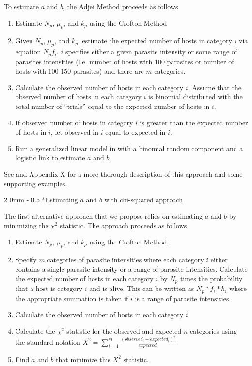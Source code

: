 \documentclass[12pt, a4paper]{article}
\makeatletter
\renewcommand{\subsection}{\@startsection
{subsection}%
{2}%
{0mm}%
{-\baselineskip}%
{0.5\baselineskip}%
{\normalfont\bf}} %
\makeatother
\begin{document}
To estimate $a$ and $b$, the Adjei Method proceeds as follows \citep{Adjei1986}

\singlespacing
\begin{enumerate}
    \item Estimate $N_p$, $\mu_p$, and $k_p$ using the Crofton Method
    \item Given $N_p$, $\mu_p$, and $k_p$, estimate the expected number of hosts in category $i$ via equation $N_p f_i$.  $i$ specifies either a given parasite intensity or some range of parasites intensities (i.e. number of hosts with 100 parasites or number of hosts with 100-150 parasites) and there are $m$ categories.
    \item Calculate the observed number of hosts in each category $i$.  Assume that the observed number of hosts in each category $i$ is binomial distributed with the total number of ``trials'' equal to the expected number of hosts in $i$.
    \item If observed number of hosts in category $i$ is greater than the expected number of hosts in $i$, let observed in $i$ equal to expected in $i$.
    \item Run a generalized linear model in with a binomial random component and a logistic link to estimate $a$ and $b$.
\end{enumerate}

\doublespacing
See \cite{Adjei1986} and Appendix X for a more thorough description of this approach and some supporting examples.

\subsection*{Estimating $a$ and $b$ with chi-squared approach}

The first alternative approach that we propose relies on estimating $a$ and $b$ by minimizing the $\chi^2$ statistic.  The approach proceeds as follows

\singlespacing
\begin{enumerate}
    \item Estimate $N_p$, $\mu_p$, and $k_p$ using the Crofton Method.
    \item Specify $m$ categories of parasite intensities where each category $i$ either contains a single parasite intensity or a range of parasite intensities.   Calculate the expected number of hosts in each category $i $ by $N_p$ times the probability that a host is category $i$ and is alive.  This can be written as $N_p * f_i * h_i$ where the appropriate summation is taken if $i$ is a range of parasite intensities.
    \item Calculate the observed number of hosts in each category $i$.
    \item Calculate the $\chi^2$ statistic for the observed and expected $n$ categories using the standard notation $X^2 = \sum_{i=1}^m \frac{(observed_i - expected_i)^2}{expected_i}$
    \item Find $a$ and $b$ that minimize this $X^2$ statistic.
\end{enumerate}
\end{document}
